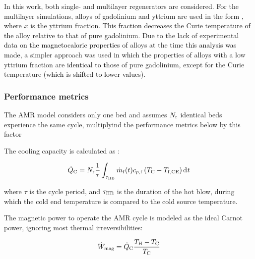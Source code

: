 \documentclass[referee]{svjour3}
\newcommand{\mrate}{\rate{m}}
\begin{document}
In this work, both single- and multilayer regenerators are considered. For the multilayer simulations, alloys of gadolinium and yttrium are used in the form , where $x$ is the yttrium fraction.  \textcolor{black}{This fraction} decreases the Curie temperature  \textcolor{black}{of the} alloy relative to that of pure gadolinium. Due to the lack of experimental  \textcolor{black}{data on the magnetocaloric properties of}  alloys at the time \textcolor{black}{this analysis was made}, a simpler approach was used \textcolor{black}{in which} the properties of alloys with {a} low yttrium fraction are \textcolor{black}{identical to those} of pure gadolinium, except for the Curie temperature \textcolor{black}{(which is shifted to lower values)}. 


\subsubsection{Performance metrics}
\label{sec:performance-metrics}

The AMR model considers only one bed and assumes $N_{\mathrm{r}}$ identical beds experience the same cycle, multiplyind the performance metrics below by this factor


The cooling capacity is calculated as \cite{bib:trevizoli16_perfor_model}:

\begin{equation}
\label{eq:99}
\qc = N\ped{r}\frac{1}{\tau} \int_{\tau\ped{HB}} \mrate\ped{f}(t) c_{p,\mathrm{f}} \left( T\ped{C} -T\ped{f,CE} \right) \diffd{t}
\end{equation}

\noindent where $\tau$ is the cycle period, and $\tau_{\mathrm{HB}}$ is the duration of the hot blow, during which the cold end temperature is compared to the cold source temperature.

\nomenclature[am]{$\mrate\ped{f}$}{mass flow rate [\si{\kg\per\second}]}

The magnetic power to operate the AMR cycle is modeled as the ideal Carnot power, ignoring most thermal irreversibilities:

\begin{equation}
\label{eq:100}
\dot{W}_{\mathrm{mag}} = \dot{Q}_{\mathrm{C}} \frac{T_{\mathrm{H}} - T_{\mathrm{C}}}{T_{\mathrm{C}}}
\end{equation}
\end{document}
